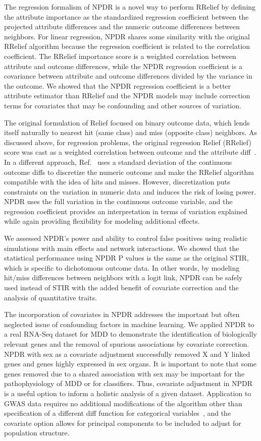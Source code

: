 \documentclass[10pt]{article}
\begin{document}
The regression formalism of NPDR is a novel way to perform RRelief by defining the attribute importance as the standardized regression coefficient between the projected attribute differences and the numeric outcome differences between neighbors.
For linear regression, NPDR shares some similarity with the original RRelief algorithm because the regression coefficient is related to the correlation coefficient.
The RRelief importance score is a weighted correlation between attribute and outcome differences, while the NPDR regression coefficient is a covariance between attribute and outcome differences divided by the variance in the outcome.
We showed that the NPDR regression coefficient is a better attribute estimator than RRelief and the NPDR models may include correction terms for covariates that may be confounding and other sources of variation. 

The original formulation of Relief focused on binary outcome data, which lends itself naturally to nearest hit (same class) and miss (opposite class) neighbors.
As discussed above, for regression problems, the original regression Relief (RRelief) score was cast as a weighted correlation between outcome and the attribute diff~\cite{robnik03}.
In a different approach, Ref.~\cite{urbanowicz17} uses a standard deviation of the continuous outcome diffs to discretize the numeric outcome and make the RRelief algorithm compatible with the idea of hits and misses.
However, discretization puts constraints on the variation in numeric data and induces the risk of losing power.
NPDR uses the full variation in the continuous outcome variable, and the regression coefficient provides an interpretation in terms of variation explained while again providing flexibility for modeling additional effects. 

We assessed NPDR's power and ability to control false positives using realistic simulations with main effects and network interactions.
We showed that the statistical performance using NPDR P values is the same as the original STIR, which is specific to dichotomous outcome data.
In other words, by modeling hit/miss differences between neighbors with a logit link, NPDR can be safely used instead of STIR with the added benefit of covariate correction and the analysis of quantitative traits.  

The incorporation of covariates in NPDR addresses the important but often neglected issue of confounding factors in machine learning. We applied NPDR to a real RNA-Seq dataset for MDD to demonstrate the identification of biologically relevant genes and the removal of spurious associations by covariate correction. NPDR with sex as a covariate adjustment successfully removed X and Y linked genes and genes highly expressed in sex organs. It is important to note that some genes removed due to a shared association with sex may be important for the pathophysiology of MDD or for classifiers.  Thus, covariate adjustment in NPDR is a useful option to inform a holistic analysis of a given dataset. Application to GWAS data requires no additional modifications of the algorithm other than specification of a different diff function for categorical variables~\cite{titv}, and the covariate option allows for principal components to be included to adjust for population structure. 
\end{document}
